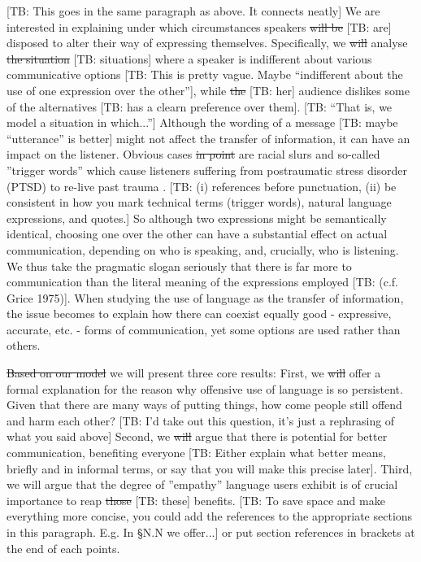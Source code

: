 \documentclass[10pt]{article}
\newcommand{\tb}[1]{\textcolor[rgb]{.8,.33,.0}{[TB: #1]}}%
\begin{document}
\tb{This goes in the same paragraph as above. It connects neatly} We are interested in explaining under which circumstances speakers \sout{will be} \tb{are} disposed to alter their way of expressing themselves. Specifically, we \sout{will} analyse \sout{the situation} \tb{situations} where a speaker is indifferent about various communicative options \tb{This is pretty vague. Maybe ``indifferent about the use of one expression over the other''}, while \sout{the} \tb{her} audience dislikes some of the alternatives \tb{has a clearn preference over them}. \tb{``That is, we model a situation in which...''} Although the wording of a message \tb{maybe ``utterance'' is better} might not affect the transfer of information, it can have an impact on the listener. Obvious cases \sout{in point} are racial slurs and so-called ''trigger words'' which cause listeners suffering from postraumatic stress disorder (PTSD) to re-live past trauma \cite{fagan2004confronting, yehuda2002post}. \tb{(i) references before punctuation, (ii) be consistent in how you mark technical terms (trigger words), natural language expressions, and quotes.} So although two expressions might be semantically identical, choosing one over the other can have a substantial effect on actual communication, depending on who is speaking, and, crucially, who is listening. We thus take the pragmatic slogan seriously that there is far more to communication than the literal meaning of the expressions employed \tb{(c.f. Grice 1975)}.
When studying the use of language as the transfer of information, the issue becomes to explain how there can coexist equally good - expressive, accurate, etc. - forms of communication, yet some options are used rather than others.

\sout{Based on our model} we will present three core results: First, we \sout{will} offer a formal explanation for the reason why offensive use of language is so persistent. Given that there are many ways of putting things, how come people still offend and harm each other? \tb{I'd take out this question, it's just a rephrasing of what you said above}  Second, we \sout{will} argue that there is potential for better communication, benefiting everyone \tb{Either explain what better means, briefly and in informal terms, or say that you will make this precise later}. Third, we will argue that the degree of ''empathy'' language users exhibit is of crucial importance to reap \sout{those} \tb{these} benefits. \tb{To save space and make everything more concise, you could add the references to the appropriate sections in this paragraph. E.g. In \S N.N we offer...} or put section references in brackets at the end of each points.
\end{document}
